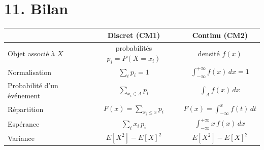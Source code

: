 
\section*{11. Bilan}

\begin{center}
\renewcommand{\arraystretch}{1.6}
\begin{tabular}{|l|c|c|}
  \hline
  & \textbf{Discret (CM1)} & \textbf{Continu (CM2)} \\
  \hline
  Objet associé à $X$ & probabilités $p_i=P(X=x_i)$ & densité $f(x)$ \\
  \hline
  Normalisation & $\sum_i p_i = 1$
    & $\displaystyle\int_{-\infty}^{+\infty} f(x)\,dx=1$ \\
  \hline
  Probabilité d'un événement & $\sum_{x_i\in A} p_i$
    & $\displaystyle\int_A f(x)\,dx$ \\
  \hline
  Répartition & $F(x)=\sum_{x_i\le x}p_i$
    & $F(x)=\int_{-\infty}^{x} f(t)\,dt$ \\
  \hline
  Espérance & $\sum_i x_i\,p_i$
    & $\displaystyle\int_{-\infty}^{+\infty} x\,f(x)\,dx$ \\
  \hline
  Variance & $E[X^2]-E[X]^2$
    & $E[X^2]-E[X]^2$ \\
  \hline
\end{tabular}
\end{center}

\medskip


